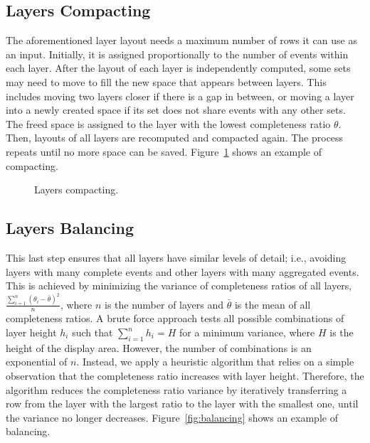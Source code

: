 \subsection{Layers Compacting}
\label{sub:compact}
The aforementioned layer layout needs a maximum number of rows it can use as an input. Initially, it is assigned proportionally to the number of events within each layer. After the layout of each layer is independently computed, some sets may need to move to fill the new space that appears between layers. This includes moving two layers closer if there is a gap in between, or moving a layer into a newly created space if its set does not share events with any other sets. The freed space is assigned to the layer with the lowest completeness ratio $\theta$. Then, layouts of all layers are recomputed and compacted again. The process repeats until no more space can be saved. Figure~\ref{fig:compacting} shows an example of compacting. 

\begin{figure}[!htb]
	\centering
	\hfill
	\caption{Layers compacting.}
	\label{fig:compacting}
\end{figure}

\subsection{Layers Balancing}
This last step ensures that all layers have similar levels of detail; i.e., avoiding layers with many complete events and other layers with many aggregated events. This is achieved by minimizing the variance of completeness ratios of all layers, 
$\frac{\sum\limits_{i=1}^{n}(\theta_i - \bar{\theta})^2} {n}$, where $n$ is the number of layers and $\bar{\theta}$ is the mean of all completeness ratios. A brute force approach tests all possible combinations of layer height $h_i$ such that $\sum\limits_{i=1}^{n}h_i=H$ for a minimum variance, where $H$ is the height of the display area. However, the number of combinations is an exponential of $n$. Instead, we apply a heuristic algorithm that relies on a simple observation that the completeness ratio increases with layer height. Therefore, the algorithm reduces the completeness ratio variance by iteratively transferring a row from the layer with the largest ratio to the layer with the smallest one, until the variance no longer decreases. Figure~\ref{fig:balancing} shows an example of balancing.

